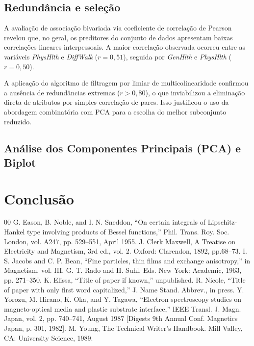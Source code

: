 \documentclass[conference]{IEEEtran}
\begin{document}
\subsection{Redundância e seleção}
A avaliação de associação bivariada via coeficiente de correlação de Pearson revelou que, no geral, os preditores do conjunto de dados apresentam baixas correlações lineares interpessoais. A maior correlação observada ocorreu entre as variáveis \textit{PhysHlth} e \textit{DiffWalk} ($r = 0,51$), seguida por \textit{GenHlth} e \textit{PhysHlth} ($r = 0,50$). 

A aplicação do algoritmo de filtragem por limiar de multicolinearidade confirmou a ausência de redundâncias extremas ($r > 0,80$), o que inviabilizou a eliminação direta de atributos por simples correlação de pares. Isso justificou o uso da abordagem combinatória com PCA para a escolha do melhor subconjunto reduzido.

\subsection{Análise dos Componentes Principais (PCA) e Biplot}


\section{Conclusão}



\begin{thebibliography}{00}
 G. Eason, B. Noble, and I. N. Sneddon, ``On certain integrals of Lipschitz-Hankel type involving products of Bessel functions,'' Phil. Trans. Roy. Soc. London, vol. A247, pp. 529--551, April 1955.
 J. Clerk Maxwell, A Treatise on Electricity and Magnetism, 3rd ed., vol. 2. Oxford: Clarendon, 1892, pp.68--73.
 I. S. Jacobs and C. P. Bean, ``Fine particles, thin films and exchange anisotropy,'' in Magnetism, vol. III, G. T. Rado and H. Suhl, Eds. New York: Academic, 1963, pp. 271--350.
 K. Elissa, ``Title of paper if known,'' unpublished.
 R. Nicole, ``Title of paper with only first word capitalized,'' J. Name Stand. Abbrev., in press.
 Y. Yorozu, M. Hirano, K. Oka, and Y. Tagawa, ``Electron spectroscopy studies on magneto-optical media and plastic substrate interface,'' IEEE Transl. J. Magn. Japan, vol. 2, pp. 740--741, August 1987 [Digests 9th Annual Conf. Magnetics Japan, p. 301, 1982].
 M. Young, The Technical Writer's Handbook. Mill Valley, CA: University Science, 1989.
\end{thebibliography}
\vspace{12pt}
\end{document}
